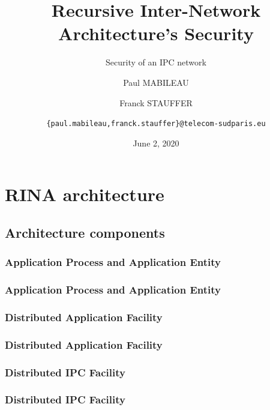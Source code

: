 \documentclass[aspectratio=169]{beamer}
\author[MABILEAU, STAUFFER]{Paul MABILEAU
\and
Franck STAUFFER
\and 
\texttt{\{paul.mabileau,franck.stauffer\}@telecom-sudparis.eu}}
\institute[TSP]{TELECOM SudParis}
\title[RINA's security]{Recursive Inter-Network Architecture's Security}
\subtitle{Security of an IPC network}
\date[2020/06/02]{June 2, 2020}
\begin{document}
\maketitle
{}

\section{RINA architecture}

\subsection{Architecture components}

\subsubsection{Application Process and Application Entity}
\begin{frame}
    \frametitle{Application Process and Application Entity}
\end{frame}

\subsubsection{Distributed Application Facility}
\begin{frame}
    \frametitle{Distributed Application Facility}
\end{frame}

\subsubsection{Distributed IPC Facility}
\begin{frame}
    \frametitle{Distributed IPC Facility}
\end{frame}
\end{document}
